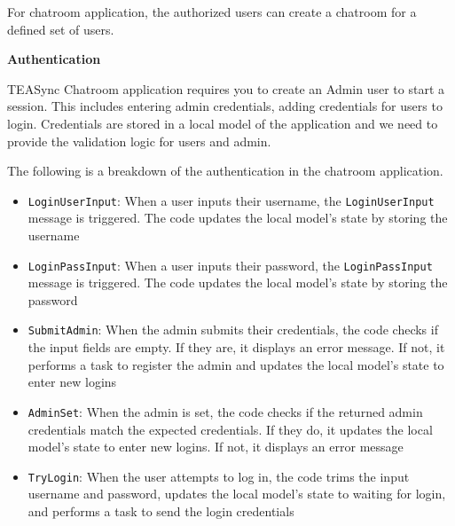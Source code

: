 For chatroom application, the authorized users can create a chatroom for a defined set of users. 

\textbf{Authentication}


TEASync Chatroom application requires you to create an Admin user to start a session. This includes entering admin credentials, adding credentials for users to login. Credentials are stored in a local model of the application and we need to provide the validation logic for users and admin.

The following is a breakdown of the authentication in the chatroom application.
\begin{itemize}
    \item \lstinline{LoginUserInput}: When a user inputs their username, the \lstinline{LoginUserInput} message is triggered. The code updates the local model's state by storing the username
    \item \lstinline{LoginPassInput}: When a user inputs their password, the \lstinline{LoginPassInput} message is triggered. The code updates the local model's state by storing the password
    \item \lstinline{SubmitAdmin}: When the admin submits their credentials, the code checks if the input fields are empty. If they are, it displays an error message. If not, it performs a task to register the admin and updates the local model's state to enter new logins
    \item \lstinline{AdminSet}: When the admin is set, the code checks if the returned admin credentials match the expected credentials. If they do, it updates the local model's state to enter new logins. If not, it displays an error message
    \item \lstinline{TryLogin}: When the user attempts to log in, the code trims the input username and password, updates the local model's state to waiting for login, and performs a task to send the login credentials
\end{itemize}
\vspace{1.5em}

